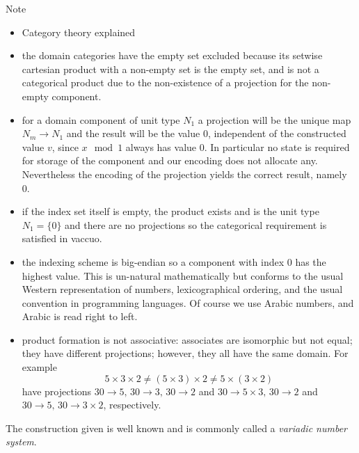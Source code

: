 \documentclass[oneside]{book}
\theoremstyle{plain}
\theoremstyle{definition}
\theoremstyle{plain}
\begin{document}
Note 
\begin{itemize}
\item Category theory explained \cite{products}
\item the domain categories have the empty set excluded because its setwise cartesian product
with a non-empty set is the empty set, and is not a categorical product due to the non-existence of 
a projection for the non-empty component.

\item
for a domain component of unit type $N_1$ a projection will be the unique
map $N_m\rightarrow N_1$ and the result will be
the value 0, independent of the constructed value $v$, since $x \mod 1$
always has value 0. In particular no state is required for storage of the
component and our encoding does not allocate any. Nevertheless the encoding
of the projection yields the correct result, namely 0.

\item
if the index set itself is empty, the product exists and is the unit type $N_1=\{0\}$
and there are no projections so the categorical requirement is satisfied in vaccuo.

\item
the indexing scheme is big-endian so a component with index 0 has the highest value.
This is un-natural mathematically but conforms to the usual Western representation
of numbers, lexicographical ordering, and the usual convention in programming languages.
Of course we use Arabic numbers, and Arabic is read right to left.

\item
product formation is not associative: associates are isomorphic but not equal;
they have different projections; however, they all have the same domain. For example
$$5 \times 3 \times 2 \neq (5 \times 3) \times 2 \neq 5 \times (3 \times 2)$$
have projections $30\rightarrow 5,\,30\rightarrow 3,\,30\rightarrow 2$ and 
$30\rightarrow 5\times 3,\,30\rightarrow 2$ and $30\rightarrow 5,\,30\rightarrow 3\times 2$,
respectively. 
\end{itemize}

The construction given is well known and is commonly called a {\em variadic number system}.
\end{document}
